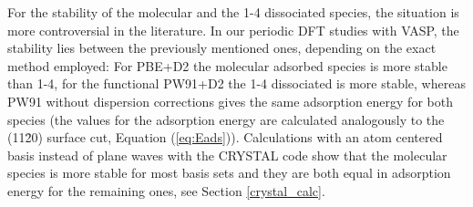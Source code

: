 \documentclass[11pt,DIV=13,BCOR=5mm,a4paper,headinclude]{scrbook}
\begin{document}
For the stability of the molecular and the 1-4 dissociated species, the situation is more controversial in the literature\cite{WirthJPCC2012,hass00,Ranea2009}.
In our periodic DFT studies with VASP, the stability lies between the previously mentioned ones, depending on the exact method employed: For PBE+D2 the molecular adsorbed species is more stable than 1-4, for the functional PW91+D2 the 1-4 dissociated is more stable, whereas PW91 without dispersion corrections gives the same adsorption energy for both species (the values for the adsorption energy are calculated analogously to the (11\=20) surface cut, Equation (\ref{eq:Eads})).
Calculations with an atom centered basis instead of plane waves with the CRYSTAL code show that the molecular species is more stable for most basis sets and they are both equal in adsorption energy for the remaining ones, see Section \ref{crystal_calc}.
\end{document}
